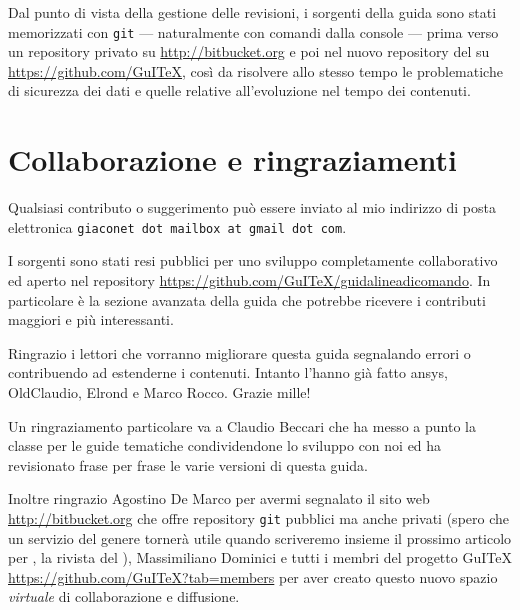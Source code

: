 Dal punto di vista della gestione delle revisioni, i sorgenti della guida sono stati memorizzati con \texttt{git} --- naturalmente con comandi dalla console --- prima verso un repository privato su \url{http://bitbucket.org} e poi nel nuovo repository del \GuIT*{} su \url{https://github.com/GuITeX}, così da risolvere allo stesso tempo le problematiche di sicurezza dei dati e quelle relative all'evoluzione nel tempo dei contenuti.

\section{Collaborazione e ringraziamenti}

Qualsiasi contributo o suggerimento può essere inviato al mio indirizzo di posta elettronica \texttt{giaconet dot mailbox at gmail dot com}.

I sorgenti sono stati resi pubblici per uno sviluppo completamente collaborativo ed aperto nel repository \url{https://github.com/GuITeX/guidalineadicomando}. In particolare è la sezione avanzata della guida che potrebbe ricevere i contributi maggiori e più interessanti.

Ringrazio i lettori che vorranno migliorare questa guida segnalando errori o contribuendo ad estenderne i contenuti. Intanto l'hanno già fatto \textsf{ansys}, \textsf{OldClaudio}, \textsf{Elrond} e Marco Rocco. Grazie mille!

Un ringraziamento particolare va a Claudio Beccari che ha messo a punto la classe per le guide tematiche condividendone lo sviluppo con noi ed ha revisionato frase per frase le varie versioni di questa guida.

Inoltre ringrazio Agostino De Marco per avermi segnalato il sito web \url{http://bitbucket.org} che offre repository \texttt{git} pubblici ma anche privati (spero che un servizio del genere tornerà utile quando scriveremo insieme il prossimo articolo per \Ars, la rivista del \GuIT*), Massimiliano Dominici e tutti i membri del progetto GuITeX  \url{https://github.com/GuITeX?tab=members} per aver creato questo nuovo spazio \emph{virtuale} di collaborazione e diffusione.




